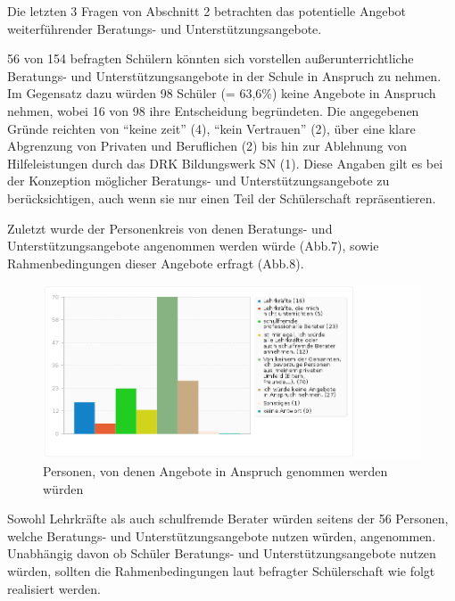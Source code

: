 Die letzten 3 Fragen von Abschnitt 2 betrachten das potentielle Angebot weiterführender Beratungs- und Unterstützungsangebote. 

56 von 154 befragten Schülern könnten sich vorstellen außerunterrichtliche Beratungs- und Unterstützungsangebote in der Schule in Anspruch zu nehmen. Im Gegensatz dazu würden 98 Schüler (= 63,6\%) keine Angebote in Anspruch nehmen, wobei 16 von 98 ihre Entscheidung begründeten. Die angegebenen Gründe reichten von "`keine  zeit"' (4), "`kein Vertrauen"' (2), über eine klare Abgrenzung von Privaten und Beruflichen (2) bis hin zur Ablehnung von Hilfeleistungen durch das DRK Bildungswerk SN (1). Diese Angaben gilt es bei der Konzeption möglicher Beratungs- und Unterstützungsangebote zu berücksichtigen, auch wenn sie nur einen Teil der Schülerschaft repräsentieren.

Zuletzt wurde der Personenkreis von denen Beratungs- und Unterstützungsangebote angenommen werden würde (Abb.7), sowie Rahmenbedingungen dieser Angebote erfragt (Abb.8). 

\begin{figure}[hp]
	\centering
		\includegraphics[width=1.0\textwidth]{images/Von-welchen-Personen-wuerden-unterstuetzende-Angebote-angenommen.png}
	\caption{Personen, von denen Angebote in Anspruch genommen werden würden}
	\label{fig:Von-welchen-Personen-wuerden-unterstuetzende-Angebote-angenommen}
\end{figure}

Sowohl Lehrkräfte als auch schulfremde Berater würden seitens der 56 Personen, welche Beratungs- und Unterstützungsangebote nutzen würden, angenommen. \\[0,5cm]

Unabhängig davon ob Schüler Beratungs- und Unterstützungsangebote nutzen würden, sollten die Rahmenbedingungen laut befragter Schülerschaft wie folgt realisiert werden. 

